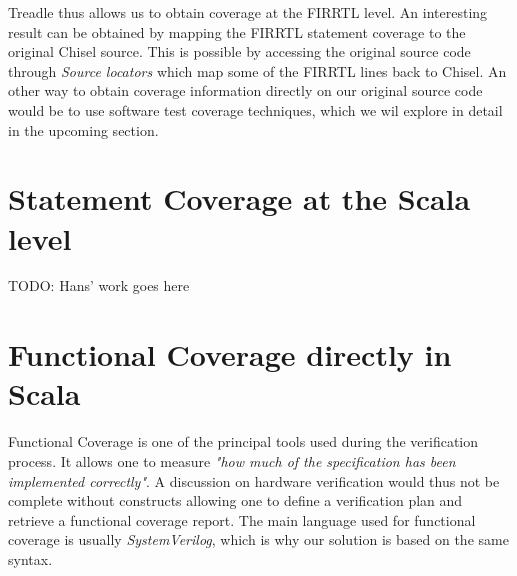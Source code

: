 \documentclass[conference]{IEEEtran}
\newcommand{\todo}[1]{{\color{olive} TODO: #1}}
\begin{document}
Treadle thus allows us to obtain coverage at the FIRRTL level. An interesting result can be obtained by mapping the FIRRTL statement coverage to the original Chisel source. This is possible by accessing the original source code through \textit{Source locators} which map some of the FIRRTL lines back to Chisel. An other way to obtain coverage information directly on our original source code would be to use software test coverage techniques, which we wil explore in detail in the upcoming section.

\section{Statement Coverage at the Scala level}
\todo{Hans' work goes here}

\section{Functional Coverage directly in Scala}
Functional Coverage is one of the principal tools used during the verification process. It allows one to measure \textit{"how much of the specification has been implemented correctly"}. A discussion on hardware verification would thus not be complete without constructs allowing one to define a verification plan and retrieve a functional coverage report. The main language used for functional coverage is usually \textit{SystemVerilog}, which is why our solution is based on the same syntax. 
\end{document}
